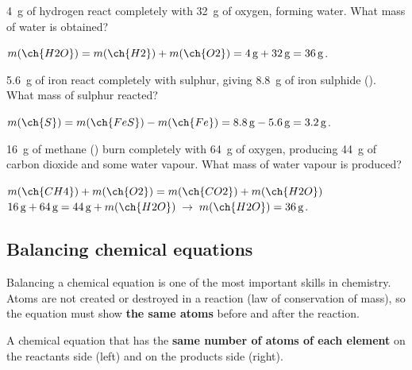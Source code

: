 \begin{exercise}
    \qty{4}{\g} of hydrogen react completely with \qty{32}{\g} of oxygen, forming water. What mass of water is obtained?
    \begin{solu}
        \(m(\ch{H2O}) = m(\ch{H2}) + m(\ch{O2}) = \qty{4}{\g} + \qty{32}{\g} = \qty{36}{\g}\).
    \end{solu}
\end{exercise}

\begin{exercise}
    \qty{5.6}{\g} of iron react completely with sulphur, giving \qty{8.8}{\g} of iron sulphide (). What mass of sulphur reacted?
    \begin{solu}
        \(m(\ch{S}) = m(\ch{FeS}) - m(\ch{Fe}) = \qty{8.8}{\g} - \qty{5.6}{\g} = \qty{3.2}{\g}\).
    \end{solu}
\end{exercise}

\begin{exercise}
    \qty{16}{\g} of methane () burn completely with \qty{64}{\g} of oxygen, producing \qty{44}{\g} of carbon dioxide and some water vapour. What mass of water vapour is produced?
    \begin{solu}
        \(m(\ch{CH4}) + m(\ch{O2}) = m(\ch{CO2}) + m(\ch{H2O})\) \\
        \(\qty{16}{\g} + \qty{64}{\g} = \qty{44}{\g} + m(\ch{H2O}) \;\to\; m(\ch{H2O}) = \qty{36}{\g}\).
    \end{solu}
\end{exercise}

\subsection{Balancing chemical equations}

\providecommand{\balok}{\textcolor{green!50!black}{\(\checkmark\)}}
\providecommand{\balno}{\textcolor{red}{\(\boldsymbol{\times}\)}}

Balancing a chemical equation is one of the most important skills in chemistry. Atoms are not created or destroyed in a reaction (law of conservation of mass), so the equation must show \textbf{the same atoms} before and after the reaction.

\begin{definition}
    A chemical equation that has the \textbf{same number of atoms of each element} on the reactants side (left) and on the products side (right).
\end{definition}

